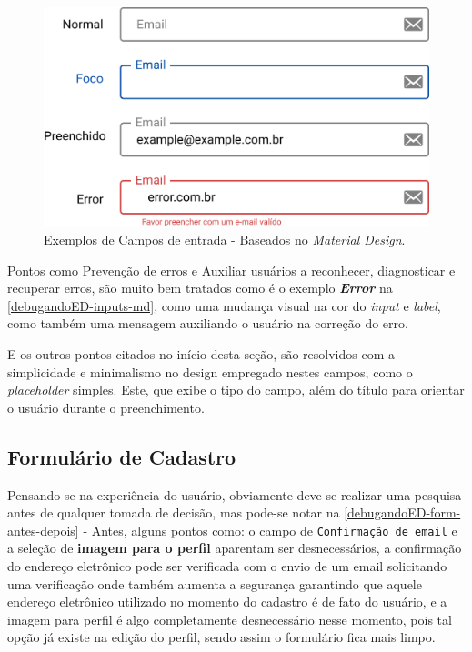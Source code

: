 \begin{figure}[ht]
    \begin{center}
	    \includegraphics[scale=0.52]{figs/debugandoED-inputs-md.png}
	\end{center}
    \caption{\label{debugandoED-inputs-md}Exemplos de Campos de entrada - Baseados no \textit{Material Design}.}
\end{figure}

Pontos como Prevenção de erros e Auxiliar usuários a reconhecer, diagnosticar e recuperar erros, são muito bem tratados como é o exemplo \textbf{\textit{Error}} na \autoref{debugandoED-inputs-md}, como uma mudança visual na cor do \textit{input} e \textit{label}, como também uma mensagem auxiliando o usuário na correção do erro.

E os outros pontos citados no início desta seção, são resolvidos com a simplicidade e minimalismo no design empregado nestes campos, como o \textit{placeholder} simples. Este, que exibe o tipo do campo,  além do título para orientar o usuário durante o preenchimento.

\subsection{Formulário de Cadastro}
\label{Formulário de Cadastro}

Pensando-se na experiência do usuário, obviamente deve-se realizar uma pesquisa antes de qualquer tomada de decisão, mas pode-se notar na \autoref{debugandoED-form-antes-depois} - Antes, alguns pontos como: o campo de \texttt{Confirmação de email} e a seleção de \textbf{imagem para o perfil} aparentam ser desnecessários, a confirmação do endereço eletrônico pode ser verificada com o envio de um email solicitando uma verificação onde também aumenta a segurança garantindo que aquele endereço eletrônico utilizado no momento do cadastro é de fato do usuário, e a imagem para perfil é algo completamente desnecessário nesse momento, pois tal opção já existe na edição do perfil, sendo assim o formulário fica mais limpo.

